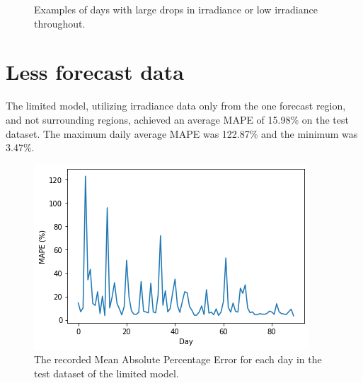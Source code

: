 \begin{figure}[ht!]
    \caption{Examples of days with large drops in irradiance or low irradiance throughout.
    \label{fig:full_high}}
\end{figure}




\clearpage
\section{Less forecast data}
The limited model, utilizing irradiance data only from the one forecast region, and not surrounding regions, achieved an average MAPE of 15.98\% on the test dataset. The maximum daily average MAPE was 122.87\% and the minimum was 3.47\%. 
\begin{figure}[ht!]
    \centering
    \includegraphics[scale=0.75]{imgs/graphs/less/days_single.png}
    \caption{The recorded Mean Absolute Percentage Error for each day in the test dataset of the limited model. 
    \label{fig:days_less}}
\end{figure}


